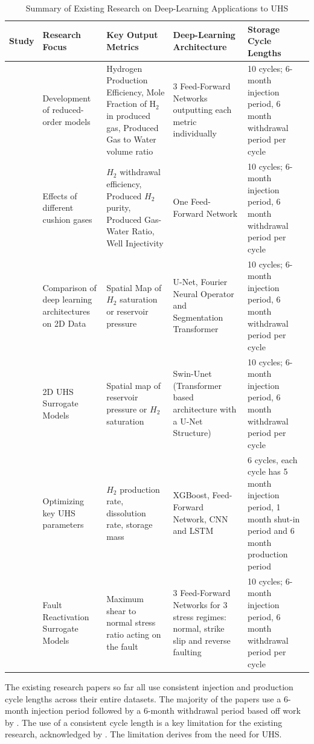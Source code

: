 \documentclass[12pt]{article}
\begin{document}
\begin{table}[h]
\centering
\caption{Summary of Existing Research on Deep-Learning Applications to UHS}
\begin{tabularx}{\textwidth}{@{}p{1.5cm} X X X X @{}}
\toprule
\textbf{Study} & \textbf{Research Focus} & \textbf{Key Output Metrics} & \textbf{Deep-Learning Architecture} & \textbf{Storage Cycle Lengths} \\
\midrule
\citet{mao2024efficient} & Development of reduced-order models & Hydrogen Production Efficiency, Mole Fraction of H$_{2}$ in produced gas, Produced Gas to Water volume ratio & 3 Feed-Forward Networks outputting each metric individually & 10 cycles; 6-month injection period, 6 month withdrawal period per cycle\\[6pt]
\citet{MAOcushion}& Effects of different cushion gases & $H_2$ withdrawal efficiency, Produced $H_2$ purity, Produced Gas-Water Ratio, Well Injectivity & One Feed-Forward Network & 10 cycles; 6-month injection period, 6 month withdrawal period per cycle\\[6pt]
\citet{mao2025deep}& Comparison of deep learning architectures on 2D Data & Spatial Map of $H_2$ saturation or reservoir pressure & U-Net, Fourier Neural Operator and Segmentation Transformer & 10 cycles; 6-month injection period, 6 month withdrawal period per cycle\\[6pt]
\citet{fu2025deep}& 2D UHS Surrogate Models & Spatial map of reservoir pressure or $H_2$ saturation & Swin-Unet (Transformer based architecture with a U-Net Structure) & 10 cycles; 6-month injection period, 6 month withdrawal period per cycle\\[6pt]
\citet{du2025combining}& Optimizing key UHS parameters & $H_2$ production rate, dissolution rate, storage mass & XGBoost, Feed-Forward Network, CNN and LSTM & 6 cycles, each cycle has 5 month injection period, 1 month shut-in period and 6 month production period \\
\citet{chellal2025quantitative}& Fault Reactivation Surrogate Models & Maximum shear to normal stress ratio acting on the fault & 3 Feed-Forward Networks for 3 stress regimes: normal, strike slip and reverse faulting  & 10 cycles; 6-month injection period, 6 month withdrawal period per cycle\\
\bottomrule
\end{tabularx}
\label{tab:related_works}
\end{table}


The existing research papers so far all use consistent injection and production cycle lengths across their entire datasets. The majority of the papers use a 6-month injection period followed by a 6-month withdrawal period based off work by \citet{malki2024operate}. The use of a consistent cycle length is a key limitation for the existing research, acknowledged by \citet{malki2024operate}. The limitation derives from the need for UHS.
\end{document}
